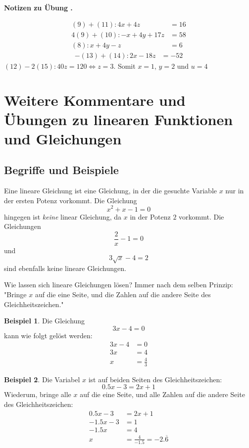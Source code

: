 \documentclass[%
11pt,%
twoside,%
titlepage,%
swissgerman,%
headsepline%
]{scrartcl}
\newcommand{\faReturnGray}{\textcolor{gray}{\faMailReply}} %
\theoremstyle{definition}
\newtheorem{bsp}{Beispiel}[subsection] %
\theoremstyle{plain}
\newcommand{\concatueb}[1]{ueb:#1}%
\newcommand{\concatlsg}[1]{lsg:#1}%
\newcounter{uebcounter}[section]
\renewcommand{\theuebcounter}{\thesection.\arabic{uebcounter}}  %
\newenvironment{lsg}[1]{%
    \par\noindent\textbf{Notizen zu Übung \theuebcounter\label{\concatlsg{#1}}}
    \hfill\hyperref[\concatueb{#1}]{\faReturnGray}\par %
}{%
    \par%
}
\begin{document}
\begin{lsg}{glsysvier}
\begin{align}
    (9)+(11) : 4x+4z &= 16\\
    4(9)+(10) : -x+4y+17z &= 58\\
    (8) : x+4y-z &= 6
\end{align}
\begin{align}
    -(13)+(14) : 2x -18z &= -52
\end{align}
$(12)-2(15) : 40z=120\Leftrightarrow z=3$. Somit $x=1$, $y=2$ und $u=4$
\end{lsg}

\clearpage

\appendix

\section{Weitere Kommentare und Übungen zu linearen Funktionen und Gleichungen}

\subsection{Begriffe und Beispiele}

Eine lineare Gleichung ist eine Gleichung, in der die gesuchte Variable $x$ nur in der ersten Potenz vorkommt. Die Gleichung $$x^2+x-1=0$$ hingegen ist \emph{keine} linear Gleichung, da $x$ in der Potenz $2$ vorkommt. Die Gleichungen $$\frac{2}{x}-1=0$$ und $$3\sqrt{x}-4=2$$ sind ebenfalls keine lineare Gleichungen.

Wie lassen sich lineare Gleichungen lösen? Immer nach dem selben Prinzip: "Bringe $x$ auf die eine Seite, und die Zahlen auf die andere Seite des Gleichheitszeichen." 

\begin{bsp}
Die Gleichung $$3x-4 = 0$$ kann wie folgt gelöst werden:
\begin{align*}
3x -4 & = 0 \tag{$+4$}\\
3x & = 4 \tag{$\div3$}\\
x & = \frac{4}{3} 
\end{align*}
\end{bsp}

\begin{bsp} Die Variabel $x$ ist auf beiden Seiten des Gleichheitszeichen: $$0.5 x-3 = 2 x+1$$ Wiederum, bringe alle $x$ auf die eine Seite, und alle Zahlen auf die andere Seite des Gleichheitszeichen:
                \begin{align*}
                0.5 x-3 & = 2 x+1\tag{$-2x$}\\
                -1.5 x -3 & = 1 \tag{$+3$}\\
                -1.5 x & =4 \tag{$\div-1.5$}\\
                x & = \frac{4}{-1.5}={-2.\overline{6}}
                \end{align*}
\end{bsp}
\end{document}
